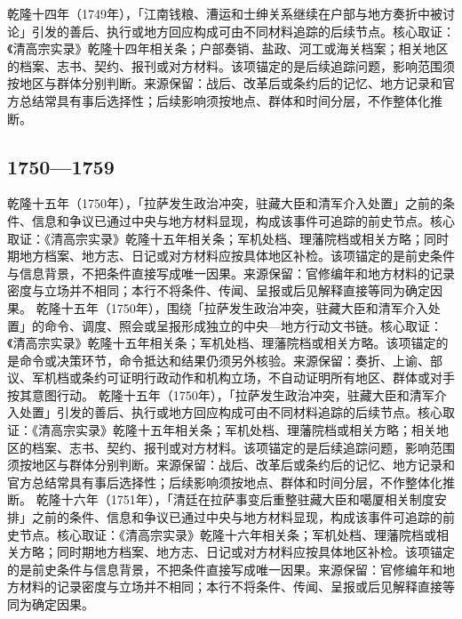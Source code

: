 乾隆十四年（1749年），「江南钱粮、漕运和士绅关系继续在户部与地方奏折中被讨论」引发的善后、执行或地方回应构成可由不同材料追踪的后续节点。核心取证：《清高宗实录》乾隆十四年相关条；户部奏销、盐政、河工或海关档案；相关地区的档案、志书、契约、报刊或对方材料。该项锚定的是后续追踪问题，影响范围须按地区与群体分别判断。来源保留：战后、改革后或条约后的记忆、地方记录和官方总结常具有事后选择性；后续影响须按地点、群体和时间分层，不作整体化推断。
\subsection{1750—1759}
乾隆十五年（1750年），「拉萨发生政治冲突，驻藏大臣和清军介入处置」之前的条件、信息和争议已通过中央与地方材料显现，构成该事件可追踪的前史节点。核心取证：《清高宗实录》乾隆十五年相关条；军机处档、理藩院档或相关方略；同时期地方档案、地方志、日记或对方材料应按具体地区补检。该项锚定的是前史条件与信息背景，不把条件直接写成唯一因果。来源保留：官修编年和地方材料的记录密度与立场并不相同；本行不将条件、传闻、呈报或后见解释直接等同为确定因果。
乾隆十五年（1750年），围绕「拉萨发生政治冲突，驻藏大臣和清军介入处置」的命令、调度、照会或呈报形成独立的中央—地方行动文书链。核心取证：《清高宗实录》乾隆十五年相关条；军机处档、理藩院档或相关方略。该项锚定的是命令或决策环节，命令抵达和结果仍须另外核验。来源保留：奏折、上谕、部议、军机档或条约可证明行政动作和机构立场，不自动证明所有地区、群体或对手按其意图行动。
乾隆十五年（1750年），「拉萨发生政治冲突，驻藏大臣和清军介入处置」引发的善后、执行或地方回应构成可由不同材料追踪的后续节点。核心取证：《清高宗实录》乾隆十五年相关条；军机处档、理藩院档或相关方略；相关地区的档案、志书、契约、报刊或对方材料。该项锚定的是后续追踪问题，影响范围须按地区与群体分别判断。来源保留：战后、改革后或条约后的记忆、地方记录和官方总结常具有事后选择性；后续影响须按地点、群体和时间分层，不作整体化推断。
乾隆十六年（1751年），「清廷在拉萨事变后重整驻藏大臣和噶厦相关制度安排」之前的条件、信息和争议已通过中央与地方材料显现，构成该事件可追踪的前史节点。核心取证：《清高宗实录》乾隆十六年相关条；军机处档、理藩院档或相关方略；同时期地方档案、地方志、日记或对方材料应按具体地区补检。该项锚定的是前史条件与信息背景，不把条件直接写成唯一因果。来源保留：官修编年和地方材料的记录密度与立场并不相同；本行不将条件、传闻、呈报或后见解释直接等同为确定因果。
